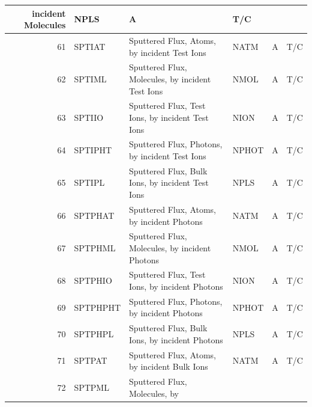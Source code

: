 \begin{landscape}
\begin{longtable}{|r|l|l|l|l|c|}
    incident Molecules & NPLS
                       & \si{\ampere}           & T/C
    \\	\hline\hline
    61                 & SPTIAT                 & Sputtered Flux, Atoms, by incident
    Test Ions          & NATM
                       & \si{\ampere}           & T/C
    \\ \hline
    62                 & SPTIML                 & Sputtered Flux, Molecules, by
    incident Test Ions & NMOL
                       & \si{\ampere}           & T/C
    \\	\hline
    63                 & SPTIIO                 & Sputtered Flux, Test Ions, by
    incident Test Ions & NION
                       & \si{\ampere}           & T/C
    \\	  \hline
    64                 & SPTIPHT                & Sputtered Flux, Photons, by incident
    Test Ions          & NPHOT
                       & \si{\ampere}           & T/C
    \\	  \hline
    65                 & SPTIPL                 & Sputtered Flux, Bulk Ions, by
    incident Test Ions & NPLS
                       & \si{\ampere}           & T/C
    \\	\hline\hline
    66                 & SPTPHAT                & Sputtered Flux, Atoms, by incident
    Photons            & NATM
                       & \si{\ampere}           & T/C
    \\ \hline
    67                 & SPTPHML                & Sputtered Flux, Molecules, by
    incident Photons   & NMOL
                       & \si{\ampere}           & T/C
    \\	\hline
    68                 & SPTPHIO                & Sputtered Flux, Test Ions, by
    incident Photons   & NION
                       & \si{\ampere}           & T/C
    \\	  \hline
    69                 & SPTPHPHT               & Sputtered Flux, Photons, by incident
    Photons            & NPHOT
                       & \si{\ampere}           & T/C
    \\	  \hline
    70                 & SPTPHPL                & Sputtered Flux, Bulk Ions, by
    incident Photons   & NPLS
                       & \si{\ampere}           & T/C
    \\	\hline \hline
    71                 & SPTPAT                 & Sputtered Flux, Atoms,  by incident
    Bulk Ions          & NATM
                       & \si{\ampere}           & T/C
    \\ \hline
    72                 & SPTPML                 & Sputtered Flux, Molecules, by

\end{longtable}
\end{landscape}
